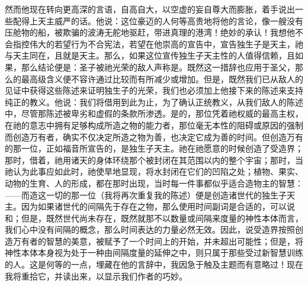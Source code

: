 然而他现在转向更高深的言语，自高自大，以空虚的妄自尊大而膨胀，着手说出一些配得上天主威严的话。他说：这位豪迈的人何等高贵地将他的言论，像一艘没有压舱物的船，被欺骗的波涛无舵地驱赶，带进真理的港湾！绝妙的承认！我想他不会指控伟大的若望行为不合宪法，若望在他崇高的宣告中，宣告独生子是天主，祂与天主同在，且就是天主。那么，如果这位宣传独生子天主性的人值得信赖，且如果，那么结论便是：圣子被祂光荣的敌人声称是。既然这一措辞也应用于圣父，那么的最高级含义便不容许通过比较而有所减少或增加。但是，既然我们已从敌人的见证中获得这些陈述来证明独生子的光荣，我们也必须加上他接下来的陈述来支持纯正的教义。他说：我们将借用到此为止，为了确认正统教义，从我们敌人的陈述中，尽管那陈述被卑劣和虚假的条款所渗透。是的，那位凭着祂权威的最高主权，在祂的意志中拥有足够构成所造之物的能力者，那位毫无本性的阻碍或原因的强制而创造万有者，确实不仅决定所造之物为善，也决定它成为善的时间。但创造万有的那一位，正如福音所宣告的，是独生子天主。祂在祂愿意的时候创造了受造界；那时，借着，祂用诸天的身体环绕那个被封闭在其范围以内的整个宇宙；那时，当祂认为此事应如此时，祂使旱地显现，将水封闭在它们的凹陷之处；植物、果实、动物的生育、人的形成，都在那时出现，当时每一件事都似乎适合造物主的智慧：——而造这一切的那一位（我将再次重复我的陈述）便是创造诸世代的独生子天主。因为如果诸世代的间隔先于存在之物，那么使用时间副词是合适的，可以说和；但是，既然世代尚未存在，既然就那不以数量或间隔来度量的神性本体而言，我们心中没有间隔的概念，那么时间表达的力量必然无效。因此，说受造界按照创造万有者的智慧的美意，被赋予了一个时间上的开始，并未超出可能性；但是，将神性本体本身视为处于一种由间隔度量的延伸之中，则只属于那些受过新智慧训练的人。这是何等的一点，埋藏在他的言辞中，我因急于触及主题而有意略过！现在我将重拾它，并读出来，以显示我们作者的巧妙。\par

